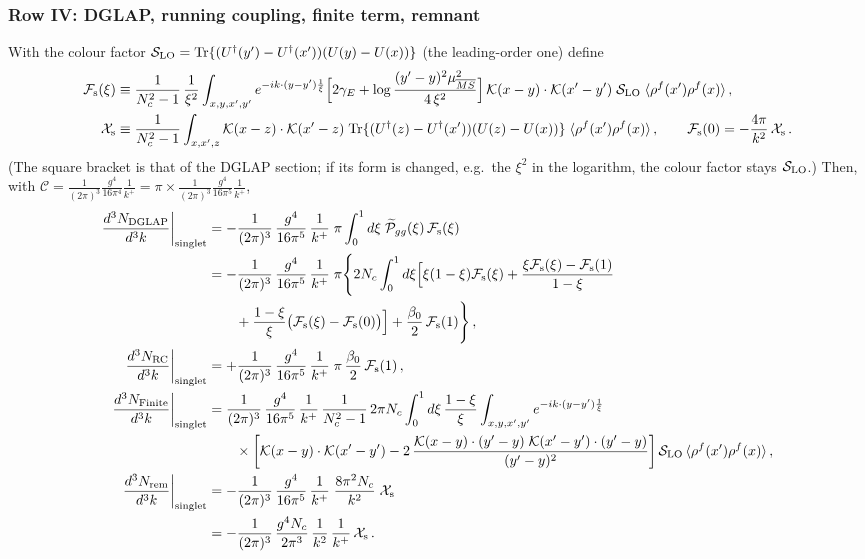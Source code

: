 \subsubsection*{Row IV: DGLAP, running coupling, finite term, remnant}
\noindent With the colour factor $\mathcal{S}_{\rm LO}={\rm Tr}\{(U^{\dagger}(y')-U^{\dagger}(x'))(U(y)-U(x))\}$ (the leading-order one) define
\begin{align}
\mathcal{F}_{\rm s}(\xi)&\equiv\frac{1}{N_{c}^{2}-1}\,\frac{1}{\xi^{2}}\int_{x,y,x',y'}e^{-ik\cdot(y-y')\frac{1}{\xi}}\Big[2\gamma_{E}+\log\frac{(y'-y)^{2}\mu^{2}_{\overline{MS}}}{4\,\xi^{2}}\Big]\,\mathcal{K}(x-y)\cdot\mathcal{K}(x'-y')\;\mathcal{S}_{\rm LO}\;\langle\rho^{f}(x')\rho^{f}(x)\rangle\,,\notag\\
\mathcal{X}_{\rm s}&\equiv\frac{1}{N_{c}^{2}-1}\int_{x,x',z}\mathcal{K}(x-z)\cdot\mathcal{K}(x'-z)\;{\rm Tr}\{(U^{\dagger}(z)-U^{\dagger}(x'))(U(z)-U(x))\}\;\langle\rho^{f}(x')\rho^{f}(x)\rangle\,,\qquad\mathcal{F}_{\rm s}(0)=-\frac{4\pi}{k^{2}}\,\mathcal{X}_{\rm s}\,.\notag
\end{align}
(The square bracket is that of the DGLAP section; if its form is changed, e.g.\ the $\xi^{2}$ in the logarithm, the colour factor stays $\mathcal{S}_{\rm LO}$.) Then, with $\mathcal{C}=\frac{1}{(2\pi)^{3}}\frac{g^{4}}{16\pi^{4}}\frac{1}{k^{+}}=\pi\times\frac{1}{(2\pi)^{3}}\frac{g^{4}}{16\pi^{5}}\frac{1}{k^{+}}$,
\begin{align}
\frac{d^{3}N_{\rm DGLAP}}{d^{3}k}\bigg|_{\rm singlet}&=-\frac{1}{(2\pi)^{3}}\,\frac{g^{4}}{16\pi^{5}}\,\frac{1}{k^{+}}\;\pi\int_{0}^{1}d\xi\;\widetilde{\mathcal P}_{gg}(\xi)\,\mathcal{F}_{\rm s}(\xi)\notag\\
&=-\frac{1}{(2\pi)^{3}}\,\frac{g^{4}}{16\pi^{5}}\,\frac{1}{k^{+}}\;\pi\Bigg\{2N_{c}\int_{0}^{1}d\xi\Big[\xi(1-\xi)\mathcal{F}_{\rm s}(\xi)+\frac{\xi\mathcal{F}_{\rm s}(\xi)-\mathcal{F}_{\rm s}(1)}{1-\xi}\notag\\&\qquad+\frac{1-\xi}{\xi}\big(\mathcal{F}_{\rm s}(\xi)-\mathcal{F}_{\rm s}(0)\big)\Big]+\frac{\beta_{0}}{2}\,\mathcal{F}_{\rm s}(1)\Bigg\}\,,\label{eq:s-DGLAP}\\
\frac{d^{3}N_{\rm RC}}{d^{3}k}\bigg|_{\rm singlet}&=+\frac{1}{(2\pi)^{3}}\,\frac{g^{4}}{16\pi^{5}}\,\frac{1}{k^{+}}\;\pi\,\frac{\beta_{0}}{2}\,\mathcal{F}_{\rm s}(1)\,,\label{eq:s-RC}\\
\frac{d^{3}N_{\rm Finite}}{d^{3}k}\bigg|_{\rm singlet}&=\frac{1}{(2\pi)^{3}}\,\frac{g^{4}}{16\pi^{5}}\,\frac{1}{k^{+}}\,\frac{1}{N_{c}^{2}-1}\,2\pi N_{c}\int_{0}^{1}d\xi\,\frac{1-\xi}{\xi}\int_{x,y,x',y'}e^{-ik\cdot(y-y')\frac{1}{\xi}}\notag\\&\qquad\times\bigg[\mathcal{K}(x-y)\cdot\mathcal{K}(x'-y')-2\,\frac{\mathcal{K}(x-y)\cdot(y'-y)\;\mathcal{K}(x'-y')\cdot(y'-y)}{(y'-y)^{2}}\bigg]\,\mathcal{S}_{\rm LO}\,\langle\rho^{f}(x')\rho^{f}(x)\rangle\,,\label{eq:s-fin}\\
\frac{d^{3}N_{\rm rem}}{d^{3}k}\bigg|_{\rm singlet}&=-\frac{1}{(2\pi)^{3}}\,\frac{g^{4}}{16\pi^{5}}\,\frac{1}{k^{+}}\;\frac{8\pi^{2}N_{c}}{k^{2}}\;\mathcal{X}_{\rm s}\notag\\&=-\frac{1}{(2\pi)^{3}}\,\frac{g^{4}N_{c}}{2\pi^{3}}\,\frac{1}{k^{2}}\,\frac{1}{k^{+}}\,\mathcal{X}_{\rm s}\,.\label{eq:s-rem}
\end{align}
